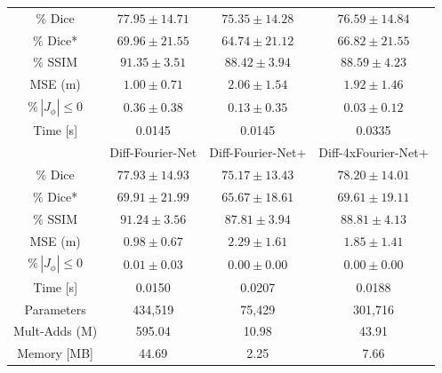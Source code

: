 \begin{table}[H]
\begin{tabular}{c c c c}
		\midrule
		$\%$ Dice & $77.95 \pm 14.71$ & $75.35 \pm 14.28$ & $76.59 \pm 14.84$\\
		$\%$ Dice* & $69.96 \pm 21.55$ & $64.74 \pm 21.12$ & $66.82 \pm 21.55$ \\
		$\%$ SSIM & $91.35 \pm 3.51$ & $88.42 \pm 3.94$ & $88.59 \pm 4.23$\\
		MSE (m) & $1.00 \pm 0.71$ & $2.06 \pm 1.54$ & $1.92 \pm 1.46$ \\
		$\% \, |J_{\phi}|\leq0$ & $0.36 \pm 0.38$ & $0.13 \pm 0.35$ & $0.03 \pm 0.12$ \\
		Time [s] & 0.0145 & 0.0145 & 0.0335 \\
		\midrule
		 & Diff-Fourier-Net & Diff-Fourier-Net+ & Diff-4xFourier-Net+\\		
		\midrule
		$\%$ Dice & $77.93 \pm 14.93$ & $75.17 \pm 13.43$ & $78.20 \pm 14.01$\\
		$\%$ Dice* & $69.91 \pm 21.99$ & $65.67 \pm 18.61$ & $69.61 \pm 19.11$ \\
		$\%$ SSIM & $91.24 \pm 3.56$ & $87.81 \pm 3.94$ & $88.81 \pm 4.13$\\
		MSE (m) & $0.98 \pm 0.67$ & $2.29 \pm 1.61$ & $1.85 \pm 1.41$ \\
		$\% \, |J_{\phi}|\leq0$ & $0.01 \pm 0.03$ & $0.00 \pm 0.00$ & $0.00 \pm 0.00$ \\
		Time [s] 	  & 0.0150  & 0.0207 & 0.0188 \\
		\midrule
		Parameters    & 434,519 & 75,429 & 301,716 \\
		Mult-Adds (M) & 595.04  & 10.98  & 43.91 \\
		Memory [MB]   & 44.69   & 2.25   & 7.66 \\
		\bottomrule
	\end{tabular}	
\end{table}



